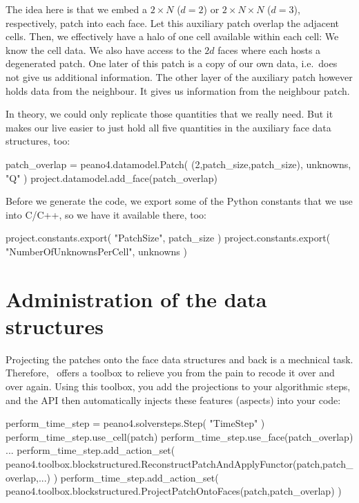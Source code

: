 The idea here is that we embed a $2 \times N$ ($d=2$) or $2 \times N \times N$
($d=3$), respectively, patch into each face. 
Let this auxiliary patch overlap the adjacent cells.
Then, we effectively have a halo of one cell available within each cell:
We know the cell data. 
We also have access to the $2d$ faces where each hosts a degenerated patch.
One later of this patch is a copy of our own data, i.e.~does not give us
additional information.
The other layer of the auxiliary patch however holds data from the neighbour.
It gives us information from the neighbour patch.


In theory, we could only replicate those quantities that we really need. 
But it makes our live easier to just hold all five quantities in the auxiliary
face data structures, too:

\begin{code}
patch_overlap = peano4.datamodel.Patch( (2,patch_size,patch_size), unknowns, "Q" )
project.datamodel.add_face(patch_overlap)
\end{code}


Before we generate the code, we export some of the Python constants that we use
into C/C++, so we have it available there, too:

\begin{code}
project.constants.export( "PatchSize", patch_size )
project.constants.export( "NumberOfUnknownsPerCell", unknowns )
\end{code}


\section{Administration of the data structures}

Projecting the patches onto the face data structures and back is a mechnical
task.
Therefore, \Peano\  offers a toolbox to relieve you from the pain to 
recode it over and over again.
Using this toolbox, you add the projections to your algorithmic steps, and the
API then automatically injects these features (aspects) into your code:

\begin{code}
perform_time_step      = peano4.solversteps.Step( "TimeStep" )
perform_time_step.use_cell(patch)
perform_time_step.use_face(patch_overlap)
...
perform_time_step.add_action_set( 
  peano4.toolbox.blockstructured.ReconstructPatchAndApplyFunctor(patch,patch_overlap,...)
) 
perform_time_step.add_action_set( 
  peano4.toolbox.blockstructured.ProjectPatchOntoFaces(patch,patch_overlap) 
)
\end{code}



